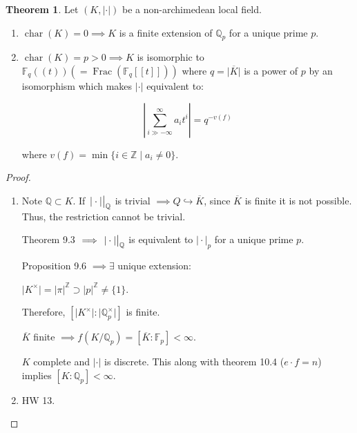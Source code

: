 \documentclass[openany]{amsbook}
\numberwithin{section}{chapter}
\theoremstyle{definition}
\newtheorem{theorem}{Theorem}[chapter]
\begin{document}
\begin{theorem}
    Let \((K,\vert \cdot \vert)\) be a non-archimedean local field.

    \begin{enumerate}[label=\roman*)]
        \item \(\operatorname{char}(K) = 0 \implies K\) is a finite extension of \(\mathbb{Q}_p\) for a unique prime \(p\).
        \item \(\operatorname{char}(K) = p > 0 \implies K\) is isomorphic to \(\mathbb{F}_q((t))(=\operatorname{Frac}(\mathbb{F}_q[[t]]))\) where \(q = \vert \overline{K} \vert \) is a power of \(p\) by an isomorphism which makes \(\vert \cdot \vert\) equivalent to:
        
        \[
            \left\vert \sum_{i\gg -\infty}^{\infty} a_i t^i \right\vert = q^{-v(f)} 
        \]

        where \(v(f) = \min\{ i\in \mathbb{Z} \mid a_i \neq 0 \}\).
    \end{enumerate} 
\end{theorem}

\begin{proof}
    \begin{enumerate}[label=\roman*)]
        \item Note \(\mathbb{Q} \subset K\). If \(\eval{\vert \cdot \vert}_{\mathbb{Q}}\) is trivial \(\implies Q \hookrightarrow \overline{K}\), since \(\overline{K}\) is finite it is not possible. Thus, the restriction cannot be trivial.
        
        Theorem 9.3 \(\implies \eval{\vert \cdot \vert}_{\mathbb{Q}}\) is equivalent to \(\vert \cdot \vert_p\) for a unique prime \(p\).

        Proposition 9.6 \(\implies \exists\) unique extension:

        \begin{center}
        \end{center}

        \(\vert K^\times \vert = \vert \pi \vert ^ \mathbb{Z} \supset \vert p \vert ^{\mathbb{Z}} \neq \{ 1 \}\).

        Therefore, \([\vert K^\times \vert : \vert \mathbb{Q}_p^\times \vert]\) is finite.

        \(\overline{K}\) finite \(\implies f(K / \mathbb{Q}_p)=[\overline{K} : \mathbb{F}_p] < \infty\).

        \(K\) complete and \(\vert \cdot \vert\) is discrete. This along with theorem 10.4 (\(e\cdot f = n\)) implies \([K:\mathbb{Q}_p] < \infty\).

        \item HW 13.
    \end{enumerate} 
\end{proof}
\end{document}
